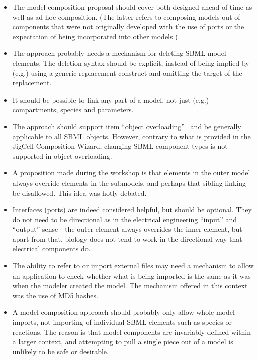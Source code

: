 \begin{enumerate}
\begin{itemize}
    \item The model composition proposal should cover both
      designed-ahead-of-time as well as ad-hoc composition. (The latter
      refers to composing models out of components that were not
      originally developed with the use of ports or the expectation of
      being incorporated into other models.)

    \item The approach probably needs a mechanism for deleting SBML
      model elements.  The deletion syntax should be explicit, instead
      of being implied by (e.g.) using a generic replacement construct
      and omitting the target of the replacement.

    \item It should be possible to link any part of a model, not just
      (e.g.) compartments, species and parameters.

    \item The approach should support item ``object
      overloading''~\cite{} and be generally applicable to all SBML
      objects.  However, contrary to what is provided in the JigCell
      Composition Wizard, changing SBML component types is not supported
      in object overloading.

    \item A proposition made during the workshop is that elements in the
      outer model always override elements in the submodels, and perhaps
      that sibling linking be disallowed.  This idea was hotly debated.

    \item Interfaces (ports) are indeed considered helpful, but should
      be optional.  They do not need to be directional as in the
      electrical engineering ``input'' and ``output'' sense---the outer
      element always overrides the inner element, but apart from that,
      biology does not tend to work in the directional way that
      electrical components do.

    \item The ability to refer to or import external files may need a
      mechanism to allow an application to check whether what is being
      imported is the same as it was when the modeler created the
      model.  The mechanism offered in this context was the use of MD5
      hashes.

    \item A model composition approach should probably only allow
      whole-model imports, not importing of individual SBML elements
      such as species or reactions.  The reason is that model components
      are invariably defined within a larger context, and attempting to
      pull a single piece out of a model is unlikely to be safe or
      desirable.


\end{itemize}
\end{enumerate}

